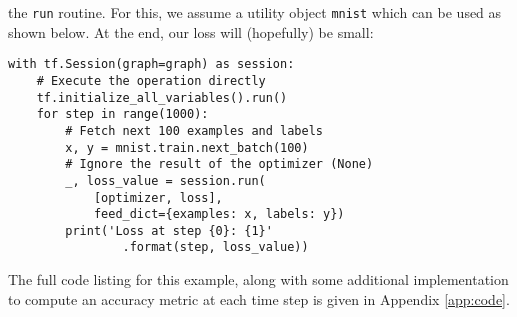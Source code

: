 the \texttt{run} routine. For this, we assume a utility object \texttt{mnist}
which can be used as shown below. At the end, our loss will (hopefully) be
small:
%
\begin{lstlisting}
with tf.Session(graph=graph) as session:
    # Execute the operation directly
    tf.initialize_all_variables().run()
    for step in range(1000):
        # Fetch next 100 examples and labels
        x, y = mnist.train.next_batch(100)
        # Ignore the result of the optimizer (None)
        _, loss_value = session.run(
            [optimizer, loss],
            feed_dict={examples: x, labels: y})
        print('Loss at step {0}: {1}'
                .format(step, loss_value))
\end{lstlisting}
%
The full code listing for this example, along with some additional
implementation to compute an accuracy metric at each time step is given in
Appendix \ref{app:code}.

